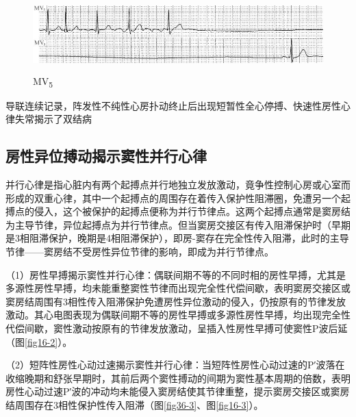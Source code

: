 \begin{figure}[!htbp]
 \centering
 \includegraphics[width=5.69792in,height=1.125in]{./images/Image00574.jpg}
 \captionsetup{justification=centering}
 \caption{MV\textsubscript{5}}
 \label{fig36-2}
  \end{figure} 
导联连续记录，阵发性不纯性心房扑动终止后出现短暂性全心停搏、快速性房性心律失常揭示了双结病

\protect\hypertarget{text00043.htmlux5cux23subid467}{}{}

\subsection{房性异位搏动揭示窦性并行心律}

并行心律是指心脏内有两个起搏点并行地独立发放激动，竟争性控制心房或心室而形成的双重心律，其中一个起搏点的周围存在着传入保护性阻滞圈，免遭另一个起搏点的侵入，这个被保护的起搏点便称为并行节律点。这两个起搏点通常是窦房结为主导节律，异位起搏点为并行节律点。但当窦房交接区有传入阻滞保护时（早期是3相阻滞保护，晚期是4相阻滞保护），即房-窦存在完全性传入阻滞，此时的主导节律------窦房结不受房性异位节律的影响，即成为并行节律点。

（1）房性早搏揭示窦性并行心律：偶联间期不等的不同时相的房性早搏，尤其是多源性房性早搏，均未能重整窦性节律而出现完全性代偿间歇，表明窦房交接区或窦房结周围有3相性传入阻滞保护免遭房性异位激动的侵入，仍按原有的节律发放激动。其心电图表现为偶联间期不等的房性早搏或多源性房性早搏，均出现完全性代偿间歇，窦性激动按原有的节律发放激动，呈插入性房性早搏可使窦性P波后延（图\ref{fig16-2}）。

（2）短阵性房性心动过速揭示窦性并行心律：当短阵性房性心动过速的P′波落在收缩晚期和舒张早期时，其前后两个窦性搏动的间期为窦性基本周期的倍数，表明房性心动过速P′波的冲动均未能侵入窦房结使其节律重整，提示窦房交接区或窦房结周围存在3相性保护性传入阻滞（图\ref{fig36-3}、图\ref{fig16-3}）。

